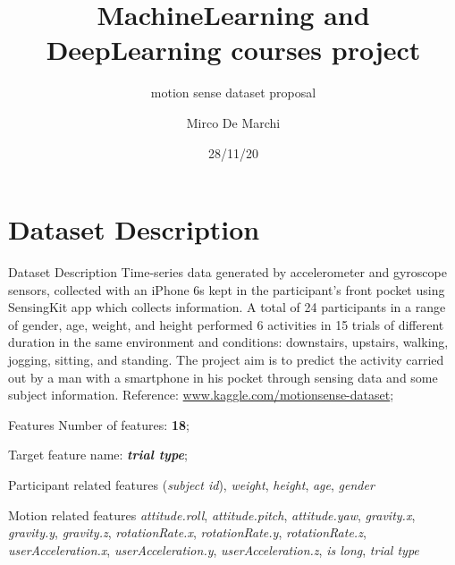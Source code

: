 \documentclass{beamer}
\title{MachineLearning and \\DeepLearning courses project}
\subtitle{motion sense dataset proposal}
\author{Mirco De Marchi}
\institute{University of Verona}
\date{28/11/20}
\begin{document}
\begin{frame}
\maketitle
\end{frame}


\section{Dataset Description}
\begin{frame}{Dataset Description}
 Time-series data generated by accelerometer and gyroscope sensors, collected with an iPhone 6s kept in the participant's front pocket using SensingKit app which collects information.
 \vfill
 A total of 24 participants in a range of gender, age, weight, and height performed 6 activities in 15 trials of different duration in the same environment and conditions: downstairs, upstairs, walking, jogging, sitting, and standing.
 \vfill
The project aim is to predict the activity carried out by a man with a smartphone in his pocket through sensing data and some subject information.
 \vfill
 Reference: \href{https://www.kaggle.com/malekzadeh/motionsense-dataset}{www.kaggle.com/motionsense-dataset};
\end{frame}

\begin{frame}{Features}
Number of features: \textbf{18};

Target feature name: \textbf{\textit{trial type}};

\begin{block}{Participant related features}
	(\textit{subject id}), \textit{weight}, \textit{height}, \textit{age}, \textit{gender}
\end{block}
\begin{block}{Motion related features}
	\textit{attitude.roll}, \textit{attitude.pitch}, \textit{attitude.yaw}, \textit{gravity.x}, \textit{gravity.y}, \textit{gravity.z}, \textit{rotationRate.x}, \textit{rotationRate.y}, \textit{rotationRate.z}, \textit{userAcceleration.x}, \textit{userAcceleration.y}, \textit{userAcceleration.z}, \textit{is long}, \textit{trial type}
\end{block}
\end{frame}
\end{document}
